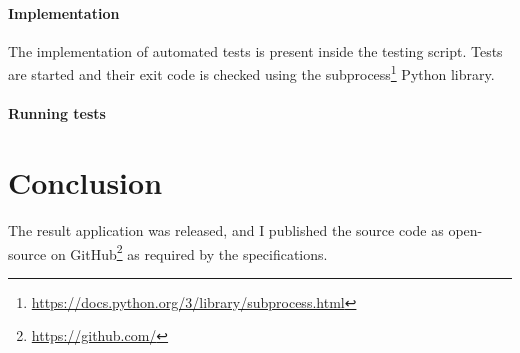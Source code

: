 \subsubsection{Implementation}
The implementation of automated tests is present inside the testing script. Tests are started and their exit code is checked using the subprocess\footnote{\url{https://docs.python.org/3/library/subprocess.html}} Python library.

\subsubsection{Running tests}

\chapter{Conclusion}
\label{ch_conclusion}

The result application was released, and I published the source code as open-source on GitHub\footnote{\url{https://github.com/}} as required by the specifications.

